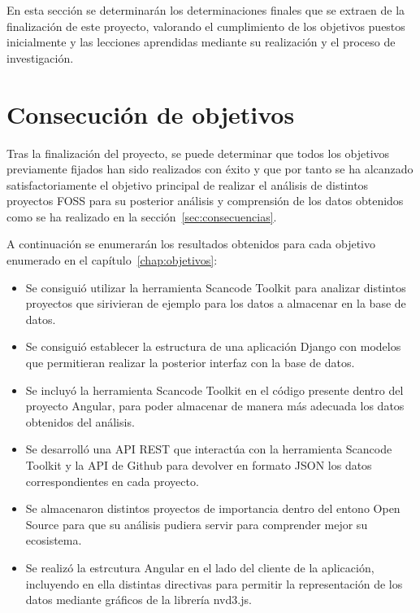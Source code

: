 \documentclass[a4paper, spanish, 12pt]{book}
\begin{document}
En esta secci\'on se determinar\'an los determinaciones finales que se extraen de
la finalizaci\'on de este proyecto, valorando el cumplimiento de los objetivos
puestos inicialmente y las lecciones aprendidas mediante su realizaci\'on y el
proceso de investigaci\'on.

\section{Consecuci\'on de objetivos}
\label{sec:consecucion-objetivos}

Tras la finalizaci\'on del proyecto, se puede determinar que todos los objetivos
previamente fijados han sido realizados con \'exito y que por tanto se ha alcanzado
satisfactoriamente el objetivo principal de realizar el an\'alisis de distintos
proyectos FOSS para su posterior an\'alisis y comprensi\'on de los datos obtenidos como
se ha realizado en la secci\'on~\ref{sec:consecuencias}.

A continuaci\'on se enumerar\'an los resultados obtenidos para cada objetivo enumerado en
el cap\'itulo~\ref{chap:objetivos}:

\begin{itemize}

\item Se consigui\'o utilizar la herramienta Scancode Toolkit para analizar distintos
proyectos que sirivieran de ejemplo para los datos a almacenar en la base de datos.

\item Se consigui\'o establecer la estructura de una aplicaci\'on Django con modelos
que permitieran realizar la posterior interfaz con la base de datos.

\item Se incluy\'o la herramienta Scancode Toolkit en el c\'odigo presente dentro del
proyecto Angular, para poder almacenar de manera m\'as adecuada los datos obtenidos
del an\'alisis.

\item Se desarroll\'o una API REST que interact\'ua con la herramienta Scancode Toolkit
y la API de Github para devolver en formato JSON los datos correspondientes en cada
proyecto.

\item Se almacenaron distintos proyectos de importancia dentro del entono Open Source
para que su an\'alisis pudiera servir para comprender mejor su ecosistema.

\item Se realiz\'o la estrcutura Angular en el lado del cliente de la aplicaci\'on,
incluyendo en ella distintas directivas para permitir la representaci\'on de los datos
mediante gr\'aficos de la librer\'ia nvd3.js.

\end{itemize}
\end{document}
